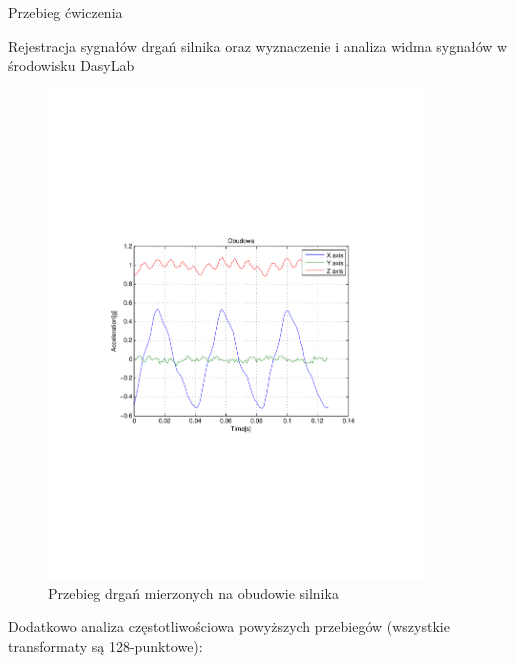 \documentclass[12pt]{article}
\begin{document}
\begin{section}{Przebieg ćwiczenia}
\begin{subsection}{Rejestracja sygnałów drgań silnika oraz wyznaczenie i
    analiza widma sygnałów w środowisku DasyLab}
\begin{figure}[!htb]
\begin{center}
                \includegraphics[trim=5cm 8.5cm 5cm
                8.5cm,width=10cm]{../res/img/a_f(t)_obudowa.pdf}
            \end{center}
            \caption{Przebieg drgań mierzonych na obudowie silnika}
            \label{rys:pobu}
        \end{figure}
        
        \newpage
        
        Dodatkowo analiza częstotliwościowa powyższych przebiegów (wszystkie
        transformaty są 128-punktowe):
        

\end{subsection}
\end{section}
\end{document}
